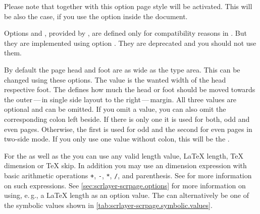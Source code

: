 Please note that together with this option page style
 will be activated. This will be also the case, if you
use the option inside the document.

%
%
Options  and , provided by
, are defined only for compatibility reasons in
. But they are implemented using option
. They are deprecated and you should not use them.%
%
\EndIndexGroup



\begin{Declaration}
\end{Declaration}
By default the page head and foot are as
wide as the type area. This can be changed using these \KOMAScript{}
options. The value  is the wanted width of the head respective
foot. The  defines how much the head or foot should be moved
towards the outer\,---\,in single side layout to the right\,---\,margin. All
three values are optional and can
be omitted. If you omit a value, you can also omit the corresponding colon
left beside. If there is only one  it is used for both, odd and
even pages. Otherwise, the first  is used for odd and the second
 for even pages in two-side mode. If you only use one value
without colon, this will be the .

For the  as well as the  you can use any valid
length value, \LaTeX{} length, \TeX{} dimension or \TeX{} skip. In addition
you may use an \eTeX{} dimension expression with basic arithmetic operations
\texttt{+}, \texttt{-}, \texttt{*}, \texttt{/}, and parenthesis. See
\cite[section~3.5]{manual:eTeX} for more information on such expressions.  See
\autoref{sec:scrlayer-scrpage.options} for more information on using,
e.\,g., a \LaTeX{} length as an option value. The  can
alternatively be one of the symbolic values shown in
\autoref{tab:scrlayer-scrpage.symbolic.values}.


